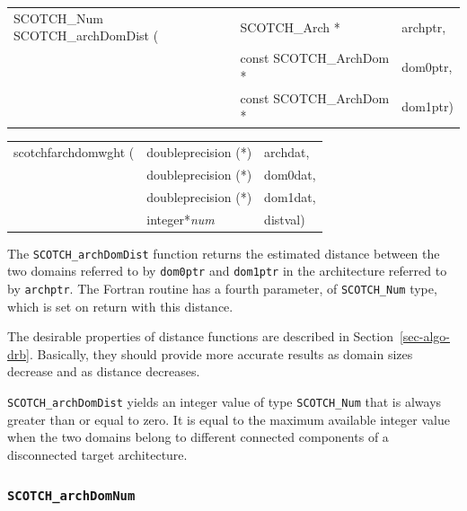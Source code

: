 \begin{itemize}
\progsyn

{\tt\begin{tabular}{l@{}ll}
SCOTCH\_Num SCOTCH\_archDomDist ( & SCOTCH\_Arch *          & archptr, \\
                                  & const SCOTCH\_ArchDom * & dom0ptr, \\
                                  & const SCOTCH\_ArchDom * & dom1ptr) \\
\end{tabular}}

{\tt\begin{tabular}{l@{}ll}
scotchfarchdomwght ( & doubleprecision (*) & archdat, \\
                     & doubleprecision (*) & dom0dat, \\
                     & doubleprecision (*) & dom1dat, \\
                     & integer*{\it num}   & distval)
\end{tabular}}

\progdes
The {\tt SCOTCH\_archDomDist} function returns the estimated distance
between the two domains referred to by {\tt dom0ptr} and {\tt dom1ptr}
in the architecture referred to by {\tt archptr}. The Fortran routine
has a fourth parameter, of {\tt SCOTCH\_\lbt Num} type, which is set
on return with this distance.

The desirable properties of distance functions are described in
Section~\ref{sec-algo-drb}. Basically, they should provide more
accurate results as domain sizes decrease and as distance decreases.

\progret

{\tt SCOTCH\_archDomDist} yields an integer value of type
{\tt SCOTCH\_\lbt Num} that is always greater than or equal to zero.
It is equal to the maximum available integer value when the two
domains belong to different connected components of a disconnected
target architecture.
\end{itemize}

\subsubsection{{\tt SCOTCH\_archDomNum}}

